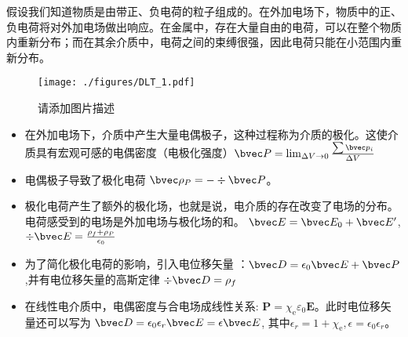 
假设我们知道物质是由带正、负电荷的粒子组成的。在外加电场下，物质中的正、负电荷将对外加电场做出响应。在金属中，存在大量自由的电荷，可以在整个物质内重新分布；而在其余介质中，电荷之间的束缚很强，因此电荷只能在小范围内重新分布。

\begin{figure}[ht]
\centering
\texttt{[image: ./figures/DLT\_1.pdf]}
\caption{请添加图片描述} \label{DLT_fig1}
\end{figure}
\begin{itemize}
\item 在外加电场下，介质中产生大量电偶极子，这种过程称为介质的极化。这使介质具有宏观可感的电偶密度（电极化强度）$\bvec P = \lim_{\Delta V \to 0} \frac{\sum \bvec p_i}{\Delta V}$ 
\item 电偶极子导致了极化电荷 $\bvec \rho_P = - \div \bvec P$。
\item 极化电荷产生了额外的极化场，也就是说，电介质的存在改变了电场的分布。电荷感受到的电场是外加电场与极化场的和。 $\bvec E = \bvec E_0 + \bvec E'$, $\div \bvec E = \frac{\rho_f+\rho_P}{\epsilon_0}$
\item 为了简化极化电荷的影响，引入电位移矢量 ：$\bvec D = \epsilon_0 \bvec E + \bvec P$,并有电位移矢量的高斯定律 $\div \bvec D = \rho_f$
\item 在线性电介质中，电偶密度与合电场成线性关系: $\mathbf P=\chi_{\mathrm e} \varepsilon_{0} \mathbf E$。此时电位移矢量还可以写为 $\bvec D = \epsilon_0 \epsilon_r \bvec E = \epsilon \bvec E $, 其中$\epsilon_r = 1+\chi_{\mathrm e}, \epsilon = \epsilon_0 \epsilon_r$。
\end{itemize}
